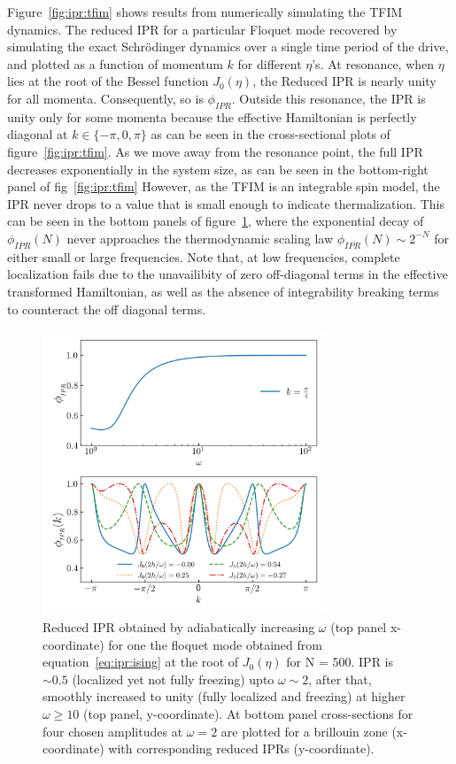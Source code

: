 \documentclass[%
reprint,
superscriptaddress,
amsmath,amssymb,
aps,
prb,
showkeys,
]{revtex4-2}
\begin{document}
	Figure~\ref{fig:ipr:tfim} shows results from numerically simulating the TFIM dynamics. The reduced IPR for a particular Floquet mode recovered by simulating the exact Schr\"odinger dynamics over a single time period of the drive, and plotted as a function of momentum $k$ for different $\eta$'s. At resonance, when $\eta$ lies at the root of the Bessel function $J_0(\eta)$,  the {Reduced} IPR is {nearly} unity for all momenta. {Consequently, so is} $\phi_{IPR}$.  Outside this resonance, the IPR is unity only for some momenta because the effective Hamiltonian is perfectly diagonal at $k \in{\{-\pi, 0, \pi\}}$ as can be seen in the cross-sectional plots of figure~\ref{fig:ipr:tfim}. {As we move away from the resonance point,
		the full IPR decreases {exponentially} in the system size, as can be seen in {the bottom-right panel of fig}~\ref{fig:ipr:tfim}}
	However, as the TFIM is an integrable spin model, the IPR never drops to a value that is small enough to indicate thermalization. {This can be seen in the bottom panels of figure}~\ref{fig:ipr:isinglowfrk}{, where the exponential decay of} $\phi_{IPR}(N)$ {never approaches the thermodynamic scaling law $\phi_{IPR}(N)\sim 2^{-N}$ for either small or large frequencies. Note that, a}t low frequencies, {complete localization} fails due to the unavailibity of zero off-diagonal terms in the  effective transformed Hamiltonian, as well as the absence of integrability breaking terms to counteract the off diagonal terms. 
	\begin{figure}[t!]
		\centering
		\includegraphics[width = 8.5cm]{ising_exact_lowfr_ipr.jpeg}
		\caption{Reduced IPR obtained by adiabatically increasing $\omega$ (top panel x-coordinate) for one the floquet mode obtained from equation~\ref{eq:ipr:ising} at the root of $J_0(\eta)$ for N = 500. IPR is $\sim 0.5$ (localized yet not fully freezing) upto $\omega \sim 2$, after that, smoothly increased to unity (fully localized and freezing) at higher $\omega \geq 10$ (top panel, y-coordinate). At bottom panel cross-sections for four chosen amplitudes at $\omega =2$ are plotted for a brillouin zone (x-coordinate) with corresponding reduced IPRs (y-coordinate).}
		\label{fig:ipr:isinglowfrk}
	\end{figure}
\end{document}
